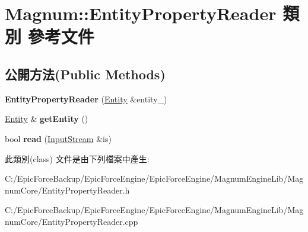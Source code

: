 \hypertarget{class_magnum_1_1_entity_property_reader}{}\section{Magnum\+:\+:Entity\+Property\+Reader 類別 參考文件}
\label{class_magnum_1_1_entity_property_reader}
\subsection*{公開方法(Public Methods)}
\begin{DoxyCompactItemize}
\item 
{\bfseries Entity\+Property\+Reader} (\hyperlink{class_magnum_1_1_entity}{Entity} \&entity\+\_\+)\hypertarget{class_magnum_1_1_entity_property_reader_a45d82c0084ad2bf7c3d07ae55a94b3ca}{}\label{class_magnum_1_1_entity_property_reader_a45d82c0084ad2bf7c3d07ae55a94b3ca}

\item 
\hyperlink{class_magnum_1_1_entity}{Entity} \& {\bfseries get\+Entity} ()\hypertarget{class_magnum_1_1_entity_property_reader_a17c6ab27aec489fa53274c2d7cc4f279}{}\label{class_magnum_1_1_entity_property_reader_a17c6ab27aec489fa53274c2d7cc4f279}

\item 
bool {\bfseries read} (\hyperlink{class_magnum_1_1_input_stream}{Input\+Stream} \&is)\hypertarget{class_magnum_1_1_entity_property_reader_a28645abbcfe27a67fe8051c92a93e8d8}{}\label{class_magnum_1_1_entity_property_reader_a28645abbcfe27a67fe8051c92a93e8d8}

\end{DoxyCompactItemize}


此類別(class) 文件是由下列檔案中產生\+:\begin{DoxyCompactItemize}
\item 
C\+:/\+Epic\+Force\+Backup/\+Epic\+Force\+Engine/\+Epic\+Force\+Engine/\+Magnum\+Engine\+Lib/\+Magnum\+Core/Entity\+Property\+Reader.\+h\item 
C\+:/\+Epic\+Force\+Backup/\+Epic\+Force\+Engine/\+Epic\+Force\+Engine/\+Magnum\+Engine\+Lib/\+Magnum\+Core/Entity\+Property\+Reader.\+cpp\end{DoxyCompactItemize}
